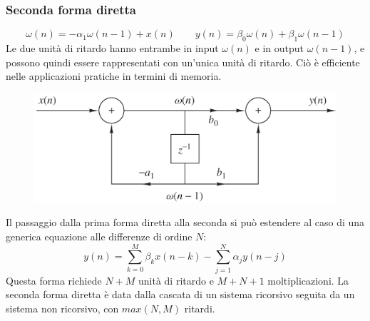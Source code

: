 \subsubsection{Seconda forma diretta}
$$\omega(n) = -\alpha_1\omega(n-1) + x(n) \qquad y(n) = \beta_0\omega(n) + \beta_1\omega(n-1)$$
Le due unità di ritardo hanno entrambe in input $\omega(n)$ e in output $\omega(n-1)$, e possono quindi essere rappresentati con un'unica unità di ritardo. Ciò è efficiente nelle applicazioni pratiche in termini di memoria. 
\begin{figure}[h]
	\centering
	\includegraphics[scale=0.4]{Lezioni/Immagini/diretta2}
\end{figure}
Il passaggio dalla prima forma diretta alla seconda si può estendere al caso di una generica equazione alle differenze di ordine $N$:
$$y(n) = \sum_{k=0}^{M}\beta_kx(n-k) - \sum_{j=1}^{N}\alpha_jy(n-j)$$
Questa forma richiede $N + M$ unità di ritardo e $M + N + 1$ moltiplicazioni. La seconda forma diretta è data dalla cascata di un sistema ricorsivo seguita da un sistema non ricorsivo, con $max(N, M)$ ritardi.
